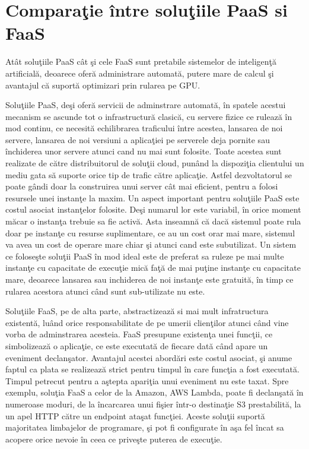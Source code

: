 \documentclass[a4paper,12pt]{report}
\begin{document}
\section{Comparaţie între soluţiile PaaS si FaaS}
\quad Atât soluţiile PaaS cât şi cele FaaS sunt pretabile sistemelor de inteligenţă artificială, deoarece oferă administrare automată, putere mare de calcul şi  avantajul că suportă optimizari prin rularea pe GPU.
\par Soluţiile PaaS, deşi oferă servicii de adminstrare automată, în spatele acestui mecanism se ascunde tot o infrastructură clasică, cu servere fizice ce rulează în mod continu, ce necesită echilibrarea traficului între acestea, lansarea de noi servere, lansarea de noi versiuni a aplicaţiei pe serverele deja pornite sau închiderea unor servere atunci cand nu mai sunt folosite. Toate acestea sunt realizate de către distribuitorul de soluţii cloud, punând la dispoziţia clientului un mediu gata să suporte orice tip de trafic către aplicaţie.  Astfel dezvoltatorul se poate gândi doar la construirea unui server cât mai eficient, pentru a folosi resursele unei instanţe la maxim. Un aspect important pentru soluţiile PaaS este costul asociat instanţelor folosite. Deşi numarul lor este variabil, în orice moment măcar o instanţa trebuie sa fie activă. Asta inseamnă că dacă sistemul poate rula doar pe instanţe cu resurse suplimentare, ce au un cost orar mai mare, sistemul va avea un cost de operare mare chiar şi atunci cand este subutilizat. Un sistem ce foloseşte soluţii PaaS în mod ideal este de preferat sa ruleze pe mai multe instanţe cu capacitate de execuţie mică faţă de mai puţine instanţe cu capacitate mare, deoarece lansarea sau inchiderea de noi instanţe este gratuită, în timp ce rularea acestora atunci când sunt sub-utilizate nu este.
\par Soluţiile FaaS, pe de alta parte, abstractizează si mai mult infratructura existentă, luând orice responsabilitate de pe umerii clienţilor atunci când vine vorba de adminstrarea acesteia. FaaS presupune existenţa unei funcţii, ce simbolizează o aplicaţie, ce este executată de fiecare dată când apare un eveniment declanşator. Avantajul acestei abordări este costul asociat, şi anume faptul ca plata se realizează strict pentru timpul în care funcţia a fost executată. Timpul petrecut pentru a aştepta apariţia unui eveniment nu este taxat. Spre exemplu, soluţia FaaS a celor de la Amazon, AWS Lambda, poate fi declanşată în numeroase moduri, de la încarcarea unui fişier într-o destinaţie S3 prestabilită, la un apel HTTP către un endpoint ataşat funcţiei. Aceste soluţii suportă majoritatea limbajelor de programare, şi pot fi configurate în aşa fel încat sa acopere orice nevoie în ceea ce priveşte puterea de execuţie.
\end{document}
